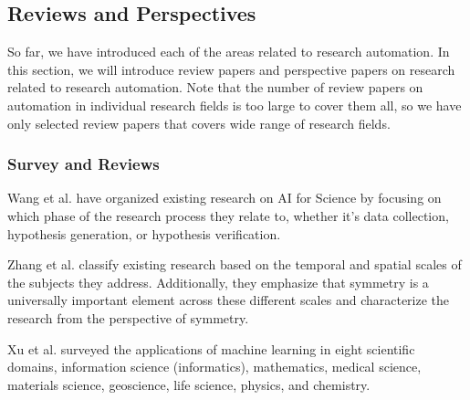 
\subsection{Reviews and Perspectives}
So far, we have introduced each of the areas related to research automation. In this section, we will introduce review papers and perspective papers on research related to research automation. Note that the number of review papers on automation in individual research fields is too large to cover them all, so we have only selected review papers that covers wide range of research fields.

\subsubsection{Survey and Reviews}

Wang et al. \cite{wang2023scientific} have organized existing research on AI for Science by focusing on which phase of the research process they relate to, whether it's data collection, hypothesis generation, or hypothesis verification.

Zhang et al. \cite{zhang2023artificial} classify existing research based on the temporal and spatial scales of the subjects they address. Additionally, they emphasize that symmetry is a universally important element across these different scales and characterize the research from the perspective of symmetry.

Xu et al. \cite{xu2021artificial} surveyed the applications of machine learning in eight scientific domains, information science (informatics), mathematics, medical science,
materials science, geoscience, life science, physics, and chemistry. 

